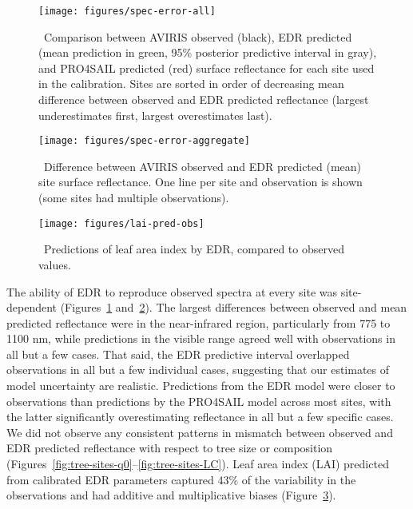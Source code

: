 \begin{figure}
  \centering
  \texttt{[image: figures/spec-error-all]}
  \caption{\label{fig:spec-error-all}\
    Comparison between AVIRIS observed (black),
    EDR predicted (mean prediction in green, 95\% posterior predictive interval in gray),
    and PRO4SAIL predicted (red)
    surface reflectance for each site used in the calibration.
    Sites are sorted in order of decreasing mean difference between observed and EDR predicted reflectance
    (largest underestimates first, largest overestimates last).
  }
\end{figure}

\begin{figure}
  \centering
  \texttt{[image: figures/spec-error-aggregate]}
  \caption{\label{fig:spec-error-aggregate}\
    Difference between AVIRIS observed and EDR predicted (mean) site surface reflectance.
    One line per site and observation is shown (some sites had multiple observations).
  }
\end{figure}

\begin{figure}
  \centering
  \texttt{[image: figures/lai-pred-obs]}
  \caption{\
    Predictions of leaf area index by EDR, compared to observed values.
  }\label{fig:lai-pred-obs}
\end{figure}

The ability of EDR to reproduce observed spectra at every site was site-dependent (Figures~\ref{fig:spec-error-all} and~\ref{fig:spec-error-aggregate}).
The largest differences between observed and mean predicted reflectance were in the near-infrared region, particularly from 775 to 1100 nm,
while predictions in the visible range agreed well with observations in all but a few cases.
That said, the EDR predictive interval overlapped observations in all but a few individual cases, suggesting that our estimates of model uncertainty are realistic.
Predictions from the EDR model were closer to observations than predictions by the PRO4SAIL model across most sites, with the latter significantly overestimating reflectance in all but a few specific cases.
We did not observe any consistent patterns in mismatch between observed and EDR predicted reflectance with respect to tree size or composition (Figures~\ref{fig:tree-sites-q0}--\ref{fig:tree-sites-LC}).
Leaf area index (LAI) predicted from calibrated EDR parameters captured 43\% of the variability in the observations and had additive and multiplicative biases (Figure~\ref{fig:lai-pred-obs}).
